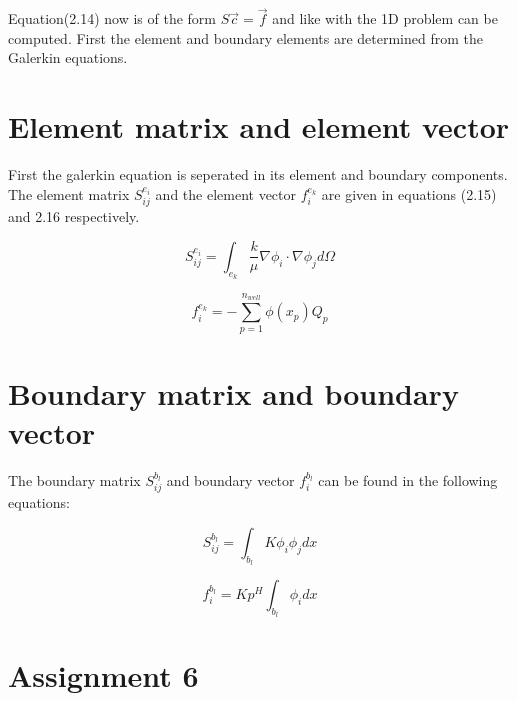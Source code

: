 \documentclass{report}
\begin{document}
Equation(2.14) now is of the form $S\vec{c}=\vec{f}$ and like with the 1D problem can be computed. First the element and boundary elements are determined from the Galerkin equations.


\section{Element matrix and element vector}

First the galerkin equation is seperated in its element and boundary components. The element matrix $S^{e_i}_{ij}$ and the element vector $f^{e_k}_i$ are given in equations (2.15) and 2.16 respectively.

\begin{equation}
	S^{e_i}_{ij} = \int_{e_k}\frac{k}{\mu}\nabla\phi_i\cdot\nabla \phi_j d\Omega
\end{equation}

\begin{equation}
	f^{e_k}_i =  -\sum_{p=1}^{n_{well}}\phi(x_p) Q_p
\end{equation}


\section{Boundary matrix and boundary vector}

The boundary matrix $S^{b_l}_{ij}$ and boundary vector $f^{b_l}_i$ can be found in the following equations:

\begin{equation}
	S^{b_l}_{ij} = \int_{b_l} K\phi_i \phi_j dx
\end{equation}

\begin{equation}
	f^{b_l}_i = Kp^H\int_{b_l}\phi_i dx
\end{equation}


\section{Assignment 6}




\end{document}
